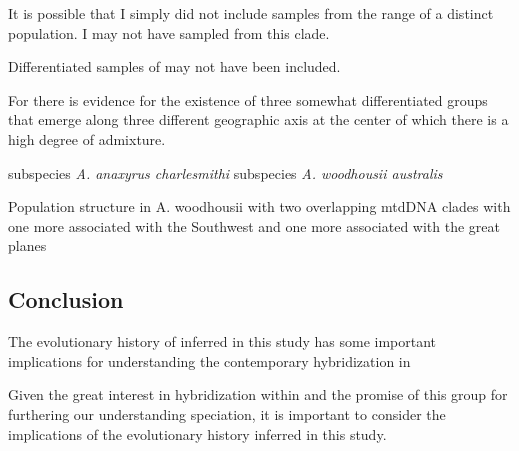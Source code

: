 It is possible that I simply did not include samples from the range of a 
distinct population.
I may not have sampled from this clade.



Differentiated samples of \wood may not have been included.


For \amer there is evidence for the existence of three somewhat differentiated groups 
that emerge along three different geographic axis at the center of which   
there is a high degree of admixture.



subspecies \textit{A. anaxyrus charlesmithi} \parencite{bragg1954}
subspecies \textit{A. woodhousii australis}


Population structure in A. woodhousii with two overlapping mtdDNA clades 
with one more associated with the Southwest and one more associated with the 
great planes \parencite{masta2003}





\subsection{Conclusion}
The evolutionary history of \anaxyrus inferred in this study has some important 
implications for understanding the contemporary hybridization in \anaxyrus


Given the great interest in hybridization within \anaxyrus and the promise of this 
group for furthering our understanding speciation, it is important to consider the 
implications of the evolutionary history inferred in this study.



